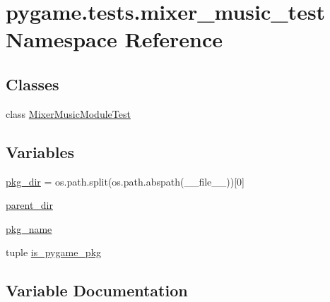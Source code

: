 \hypertarget{namespacepygame_1_1tests_1_1mixer__music__test}{}\section{pygame.\+tests.\+mixer\+\_\+music\+\_\+test Namespace Reference}
\label{namespacepygame_1_1tests_1_1mixer__music__test}
\subsection*{Classes}
\begin{DoxyCompactItemize}
\item 
class \hyperlink{classpygame_1_1tests_1_1mixer__music__test_1_1_mixer_music_module_test}{Mixer\+Music\+Module\+Test}
\end{DoxyCompactItemize}
\subsection*{Variables}
\begin{DoxyCompactItemize}
\item 
\hyperlink{namespacepygame_1_1tests_1_1mixer__music__test_aa0eaccfe4d352700b64463ff5628814a}{pkg\+\_\+dir} = os.\+path.\+split(os.\+path.\+abspath(\+\_\+\+\_\+file\+\_\+\+\_\+))\mbox{[}0\mbox{]}
\item 
\hyperlink{namespacepygame_1_1tests_1_1mixer__music__test_a64bf2c08109896a7f4f535244c3f7360}{parent\+\_\+dir}
\item 
\hyperlink{namespacepygame_1_1tests_1_1mixer__music__test_a9318072bacddca0666dd61a509e3fd02}{pkg\+\_\+name}
\item 
tuple \hyperlink{namespacepygame_1_1tests_1_1mixer__music__test_af8f4e47ae6d777104293be40fbd528a0}{is\+\_\+pygame\+\_\+pkg}
\end{DoxyCompactItemize}


\subsection{Variable Documentation}
\mbox{\label{namespacepygame_1_1tests_1_1mixer__music__test_af8f4e47ae6d777104293be40fbd528a0}} 
